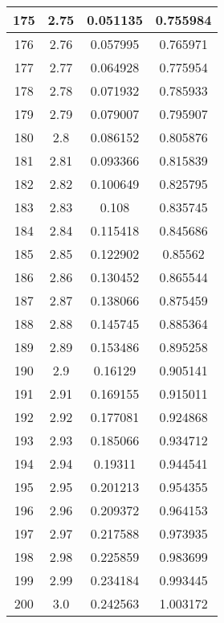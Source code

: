\begin{table}
\begin{center}
\begin{tabular}{c|c|c|c}
			175 & 2.75 & 0.051135 & 0.755984 \\
			\hline
			176 & 2.76 & 0.057995 & 0.765971 \\
			\hline
			177 & 2.77 & 0.064928 & 0.775954 \\
			\hline
			178 & 2.78 & 0.071932 & 0.785933 \\
			\hline
			179 & 2.79 & 0.079007 & 0.795907 \\
			\hline
			180 & 2.8 & 0.086152 & 0.805876 \\
			\hline
			181 & 2.81 & 0.093366 & 0.815839 \\
			\hline
			182 & 2.82 & 0.100649 & 0.825795 \\
			\hline
			183 & 2.83 & 0.108 & 0.835745 \\
			\hline
			184 & 2.84 & 0.115418 & 0.845686 \\
			\hline
			185 & 2.85 & 0.122902 & 0.85562 \\
			\hline
			186 & 2.86 & 0.130452 & 0.865544 \\
			\hline
			187 & 2.87 & 0.138066 & 0.875459 \\
			\hline
			188 & 2.88 & 0.145745 & 0.885364 \\
			\hline
			189 & 2.89 & 0.153486 & 0.895258 \\
			\hline
			190 & 2.9 & 0.16129 & 0.905141 \\
			\hline
			191 & 2.91 & 0.169155 & 0.915011 \\
			\hline
			192 & 2.92 & 0.177081 & 0.924868 \\
			\hline
			193 & 2.93 & 0.185066 & 0.934712 \\
			\hline
			194 & 2.94 & 0.19311 & 0.944541 \\
			\hline
			195 & 2.95 & 0.201213 & 0.954355 \\
			\hline
			196 & 2.96 & 0.209372 & 0.964153 \\
			\hline
			197 & 2.97 & 0.217588 & 0.973935 \\
			\hline
			198 & 2.98 & 0.225859 & 0.983699 \\
			\hline
			199 & 2.99 & 0.234184 & 0.993445 \\
			\hline
			200 & 3.0 & 0.242563 & 1.003172 \\
		\end{tabular}
	\end{center}
\end{table}